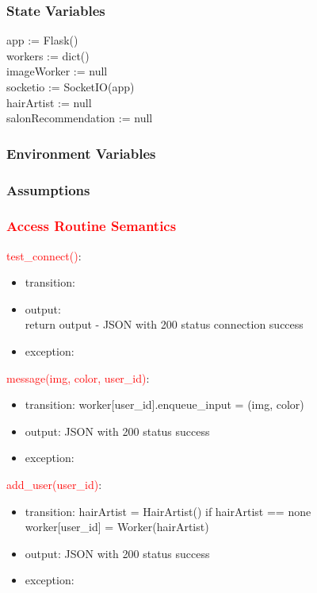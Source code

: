 \documentclass[12pt, titlepage]{article}
\begin{document}
\subsubsection{State Variables}
app := Flask() \\
workers := dict() \\
imageWorker := null \\
socketio := SocketIO(app) \\
hairArtist := null \\
salonRecommendation := null

\subsubsection{Environment Variables}

\subsubsection{Assumptions}

\subsubsection{\textcolor{red}{Access Routine Semantics}}
\noindent \textcolor{red}{test\_connect()}:
\begin{itemize}
\item transition:
\item output: \\
return output - JSON with 200 status connection success
\item exception: 
\end{itemize}

\noindent \textcolor{red}{message(img, color, user\_id)}:
\begin{itemize}
\item transition: worker[user\_id].enqueue\_input = (img, color)
\item output: JSON with 200 status success
\item exception: 
\end{itemize}

\noindent \textcolor{red}{add\_user(user\_id)}:
\begin{itemize}
\item transition: 
hairArtist = HairArtist() if hairArtist == none \\
worker[user\_id] = Worker(hairArtist)
\item output: JSON with 200 status success
\item exception: 
\end{itemize}
\end{document}
